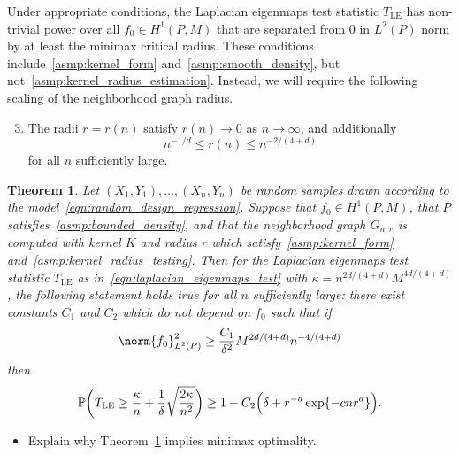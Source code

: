 \documentclass{article}
\newcommand{\1}{\mathbf{1}}
\newcommand{\Leb}{L}
\newcommand{\Pbb}{\mathbb{P}}
\newcommand{\LE}{\mathrm{LE}}
\theoremstyle{alden}
\theoremstyle{aldenthm}
\newtheorem{theorem}{Theorem}
\theoremstyle{definition}
\theoremstyle{remark}
\begin{document}
Under appropriate conditions, the Laplacian eigenmaps test statistic $T_{\LE}$ has non-trivial power over all $f_0 \in H^1(P,M)$ that are separated from $0$ in $\Leb^2(P)$ norm by at least the minimax critical radius. These conditions include~\ref{asmp:kernel_form} and~\ref{asmp:smooth_density}, but not~\ref{asmp:kernel_radius_estimation}. Instead, we will require the following scaling of the neighborhood graph radius.
\begin{enumerate}[label=(K\arabic*)]
	\setcounter{enumi}{2}
	\item 
	\label{asmp:kernel_radius_testing}
	The radii $r = r(n)$ satisfy $r(n) \to 0$ as $n \to \infty$, and additionally
	\begin{equation*}
	n^{-1/d} \leq r(n) \leq n^{-2/(4 + d)}
	\end{equation*}
	for all $n$ sufficiently large.
\end{enumerate}

\begin{theorem}
	\label{thm:laplacian_eigenmaps_testing1}
	Let $(X_1,Y_1),\ldots,(X_n,Y_n)$ be random samples drawn according to the model~\eqref{eqn:random_design_regression}. Suppose that $f_0 \in H^1(P,M)$, that
	$P$ satisfies~\ref{asmp:bounded_density}, and that the neighborhood graph $G_{n,r}$ is computed with kernel $K$ and radius $r$ which satisfy~\ref{asmp:kernel_form} and~\ref{asmp:kernel_radius_testing}.
	Then for the Laplacian eigenmaps test statistic $T_{\LE}$ as in~\eqref{eqn:laplacian_eigenmaps_test} with $\kappa = n^{2d/(4 + d)} M^{4d/(4 + d)}$, the following statement holds true for all $n$ sufficiently large: there exist constants $C_1$ and $C_2$ which do not depend on $f_0$ such that if
	\begin{equation}
	\label{eqn:laplacian_eigenmaps_testing}
	\norm{f_0}_{\Leb^2(P)}^2 \geq \frac{C_1}{\delta^2} M^{2d/(4 + d)} n^{-4/(4 + d)}
	\end{equation}
	then
	\begin{equation*}
	\Pbb \biggl(T_{\LE} \geq \frac{\kappa}{n} + \frac{1}{\delta}\sqrt{\frac{2\kappa}{n^2}}\biggr) \geq 1 - C_2\Bigl(\delta + r^{-d} \exp\{- c n r^d\}\Bigr).
	\end{equation*}
\end{theorem}
\begin{itemize}
	\item Explain why Theorem~\ref{thm:laplacian_eigenmaps_testing1} implies minimax optimality.
\end{itemize}
\end{document}
